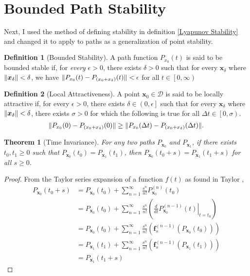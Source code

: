 \documentclass{article}
\newcommand{\B}[1]{\boldsymbol{#1}}
\DeclarePairedDelimiter\norm{\lVert}{\rVert}%
\newtheorem{theorem}{Theorem}[section]
\theoremstyle{definition}
\newtheorem{definition}{Definition}[section]
\theoremstyle{remark}
\begin{document}
\section{Bounded Path Stability}
Next, I used the method of defining stability in definition \ref{Lyapunov Stability}
and changed it to apply to paths as a generalization of point stability.
\begin{definition}[Bounded Stability]
  \label{Bounded Stability}
  A path function $P_{x_0}(t)$ is said to be bounded stable if, for \textit{every}
  $\epsilon > 0$, there exists $\delta > 0$ such that for every $\B{x}_\delta$ where
  $\norm{\B{x}_\delta} < \delta$, we have $\norm{P_{x_0}(t) - P_{\left(x_0 + x_\delta\right)}(t)} < \epsilon$ for all $t \in \left[0, \infty \right)$
\end{definition}

\begin{definition}[Local Attractiveness]
  \label{Local Path Attractiveness}
  A point $\B{x}_0 \in \mathcal{D}$ is said to be locally attractive if,
  for every $\epsilon > 0$, there exists $\delta \in \left(0, \epsilon\right]$ such that
  for every $\B{x}_\delta$ where $\norm{\B{x}_\delta} < \delta$,
  there exists $\sigma > 0$ for which the following is true
  for all $\Delta t \in \left[0, \sigma \right)$.
  \begin{align}
  \norm{P_{x_0}(0) - P_{\left(x_0 + x_\delta\right)}(0)} \ge \norm{P_{x_0}(\Delta t) - P_{\left(x_0 + x_\delta\right)}(\Delta t)}.
  \end{align}  
\end{definition}

\begin{theorem}[Time Invariance]
  \label{Time Invariance}
  For any two paths $P_{\B{x}_0}$ and $P_{\B{x}_1}$, if there exists $t_0, t_1 \geq 0$ such that
  $P_{\B{x}_0}(t_0) = P_{\B{x}_1}(t_1)$, then $P_{\B{x}_0}(t_0 + s) = P_{\B{x}_1}(t_1 + s)$ for all $s \geq 0$.
\end{theorem}

\begin{proof}
  From the Taylor series expansion of a function $f(t)$ as found in Taylor \cite{AdvancedCalculus},
  \begin{align}
    P_{\B{x}_0}(t_0 + s) &= P_{\B{x}_0}(t_0) + \sum_{n=1}^{\infty} \frac{s^n}{n!} P_{\B{x}_0}^{(n)}(t_0) \nonumber\\
    & = P_{\B{x}_0}(t_0) + \sum_{n=1}^{\infty} \frac{s^n}{n!} \left( \left. \frac{d}{dt}P_{\B{x}_0}^{(n-1)}(t) \right\rvert_{t=t_0} \right) \nonumber\\
    & = P_{\B{x}_0}(t_0) + \sum_{n=1}^{\infty} \frac{s^n}{n!} \left( \B{f}_s^{(n-1)} \left( P_{\B{x}_0}(t_0) \right) \right) \nonumber\\
    & = P_{\B{x}_1}(t_1) + \sum_{n=1}^{\infty} \frac{s^n}{n!} \left( \B{f}_s^{(n-1)} \left( P_{\B{x}_1}(t_1) \right) \right) \nonumber\\
    & = P_{\B{x}_1}(t_1 + s) \nonumber
  \end{align}
\end{proof}
\end{document}
